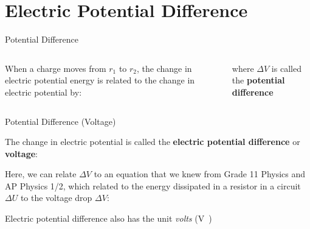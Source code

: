 \documentclass[12pt,aspectratio=169]{beamer}
\begin{document}
\section{Electric Potential Difference}

\begin{frame}{Potential Difference}
  \begin{columns}

    When a charge moves from $r_1$ to $r_2$, the change in electric potential
    energy is related to the change in electric potential by:


    where $\Delta V$ is called the \textbf{potential difference}
  \end{columns}
\end{frame}




\begin{frame}{Potential Difference (Voltage)}

  The change in electric potential is called the
  \textbf{electric potential difference} or \textbf{voltage}:


  Here, we can relate $\Delta V$ to an equation that we knew from Grade 11
  Physics and AP Physics 1/2, which related to the energy dissipated in a
  resistor in a circuit $\Delta U$ to the voltage drop $\Delta V$:
    

  Electric potential difference also has the unit \emph{volts} (\si\volt)
\end{frame}
\end{document}
